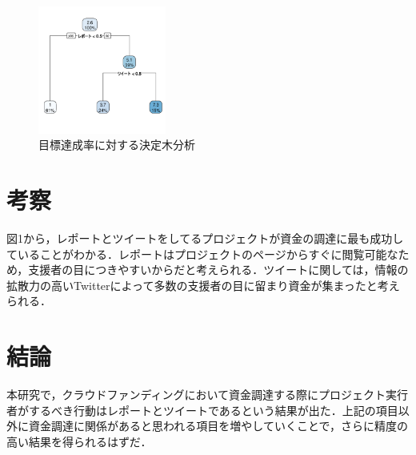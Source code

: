 \documentclass[uplatex,twocolumn,dvipdfmx]{jsarticle}
\begin{document}
\begin{figure}[h]
\centering
\includegraphics[width=4.2cm,clip]{ket.pdf}
\caption{目標達成率に対する決定木分析}\label{サンプル図}
\end{figure}

\section{考察}
図1から，レポートとツイートをしてるプロジェクトが資金の調達に最も成功していることがわかる．レポートはプロジェクトのページからすぐに閲覧可能なため，支援者の目につきやすいからだと考えられる．ツイートに関しては，情報の拡散力の高いTwitterによって多数の支援者の目に留まり資金が集まったと考えられる．


\section{結論}
本研究で，クラウドファンディングにおいて資金調達する際にプロジェクト実行者がするべき行動はレポートとツイートであるという結果が出た．上記の項目以外に資金調達に関係があると思われる項目を増やしていくことで，さらに精度の高い結果を得られるはずだ．


\end{document}
